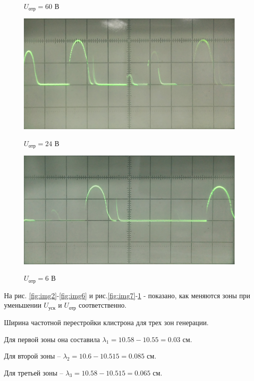 \begin{figure}[h]
\begin{minipage}[h]{0.45\linewidth}
		\caption{$U_{\text{отр}}=60$ В}
		\label{fig:img9}
	\end{minipage}
	\hfill
	\begin{minipage}[h]{0.45\textwidth}
		\centering
		{\includegraphics[width=\textwidth]{img/img10}}
		\caption{$U_{\text{отр}}=24$ В}
		\label{fig:img10}
	\end{minipage}

		\begin{minipage}[h]{0.45\textwidth}
		\centering
		{\includegraphics[width=\textwidth]{img/img11}}
		\caption{$U_{\text{отр}}=6$ В}
		\label{fig:img11}
	\end{minipage}
\end{figure}
На рис. \ref{fig:img2}-\ref{fig:img6}  и рис.\ref{fig:img7}-\ref{fig:img11} - показано, как меняются зоны при уменьшении $U_{\text{уск}}$ и $U_{\text{отр}}$ соответственно. 

Ширина частотной перестройки клистрона для трех зон генерации.

Для первой зоны она составила $\lambda_1=10.58-10.55=0.03$ см.

Для второй зоны -- $\lambda_2=10.6-10.515=0.085$ см.

Для третьей зоны -- $\lambda_3=10.58-10.515=0.065$ см.

